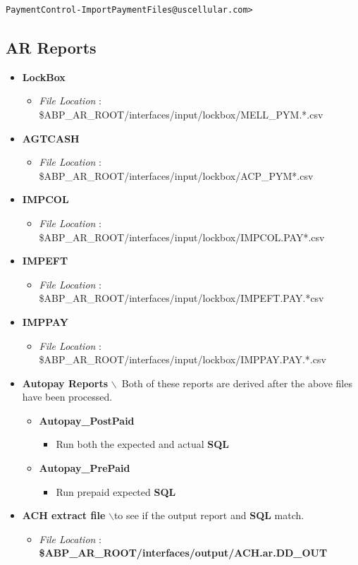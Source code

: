 \documentclass[12pt,twoside]{article}
\begin{document}
\begin{verbatim}
PaymentControl-ImportPaymentFiles@uscellular.com>
\end{verbatim}
\subsection{AR Reports}
\label{sec:orgheadline64}
\begin{itemize}
\item \textbf{LockBox}
\begin{itemize}
\item \emph{File Location} :
\$ABP\_AR\_ROOT/interfaces/input/lockbox/MELL\_PYM.*.csv
\end{itemize}
\item \textbf{AGTCASH}
\begin{itemize}
\item \emph{File Location} :
\$ABP\_AR\_ROOT/interfaces/input/lockbox/ACP\_PYM*.csv
\end{itemize}
\item \textbf{IMPCOL}
\begin{itemize}
\item \emph{File Location} :
\$ABP\_AR\_ROOT/interfaces/input/lockbox/IMPCOL.PAY*.csv
\end{itemize}
\item \textbf{IMPEFT}
\begin{itemize}
\item \emph{File Location} :
\$ABP\_AR\_ROOT/interfaces/input/lockbox/IMPEFT.PAY.*csv
\end{itemize}
\item \textbf{IMPPAY}
\begin{itemize}
\item \emph{File Location} :
\$ABP\_AR\_ROOT/interfaces/input/lockbox/IMPPAY.PAY.*.csv
\end{itemize}
\item \textbf{Autopay Reports} $\backslash$\ Both of these reports are derived after
the above files have been processed.
\begin{itemize}
\item \textbf{Autopay\_PostPaid}
\begin{itemize}
\item Run both the expected and actual \textbf{SQL}
\end{itemize}
\item \textbf{Autopay\_PrePaid}
\begin{itemize}
\item Run prepaid expected \textbf{SQL}
\end{itemize}
\end{itemize}
\item \textbf{ACH extract file} $\backslash$\Check to see if the output report and
\textbf{SQL} match.
\begin{itemize}
\item \emph{File Location} :
\textbf{\$ABP\_AR\_ROOT/interfaces/output/ACH.ar.DD\_OUT} \\
\end{itemize}
\end{itemize}
\end{document}
